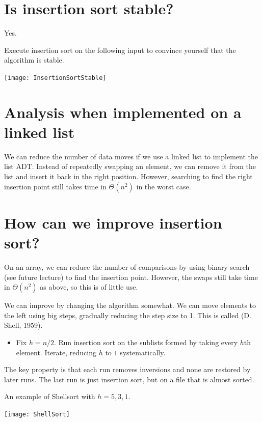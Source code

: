 \section{Is insertion sort stable?}
Yes.

\begin{Boxample}[0]
Execute insertion sort on the following input to convince yourself that the algorithm is stable.
\begin{center}
\texttt{[image: InsertionSortStable]} 
\end{center}
\end{Boxample}

\section{Analysis when implemented on a linked list}
We can reduce the number of data moves if we use a linked list to implement 
the list ADT.
Instead of repeatedly swapping an element, we can remove it from the list and insert it back in the right position.
However, searching to find the right insertion point still takes time in
$\Theta(n^2)$ in the worst case.

\section{How can we improve insertion sort?}
On an array, we can reduce the number of comparisons by using binary search (see future lecture) to find 
the insertion point. However, the swaps still take time in $\Theta(n^2)$ as above, so this is of little use.

We can improve by changing the algorithm somewhat.
We can move elements to the left using big steps, gradually reducing the 
step size to 1. This is called  (D. Shell, 1959). 
\begin{itemize}
  \item Fix $h = n/2$. Run insertion sort on the sublists formed by taking 
every $h$th element. Iterate, reducing $h$ to $1$ systematically. 
\end{itemize}
The key property is that each run removes inversions and none are 
restored by later runs. The last run is just insertion sort, but on a file that 
is almost sorted.

\begin{Boxample}
An example of Shellsort with $h = 5, 3, 1$.
\begin{center}
  \texttt{[image: ShellSort]} 
\end{center}
\end{Boxample}


